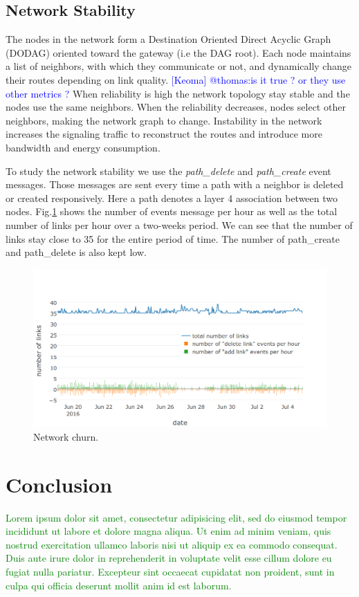 \documentclass{sig-alternate}
\newcommand{\lorem}          {\textcolor{green}{Lorem ipsum dolor sit amet, consectetur adipisicing elit, sed do eiusmod tempor incididunt ut labore et dolore magna aliqua. Ut enim ad minim veniam, quis nostrud exercitation ullamco laboris nisi ut aliquip ex ea commodo consequat. Duis aute irure dolor in reprehenderit in voluptate velit esse cillum dolore eu fugiat nulla pariatur. Excepteur sint occaecat cupidatat non proident, sunt in culpa qui officia deserunt mollit anim id est laborum.}}
\newcommand{\keoma}[1]       {\textcolor{blue}{[Keoma] #1}}
\begin{document}
\subsection{Network Stability}
\label{sec:net_stability}


The nodes in the network form a Destination Oriented Direct Acyclic Graph (DODAG) oriented toward the gateway (i.e the DAG root).
Each node maintains a list of neighbors, with which they communicate or not, and dynamically change their routes depending on link quality. \keoma{@thomas:is it true ? or they use other metrics ?}
When reliability is high the network topology stay stable and the nodes use the same neighbors.
When the reliability decreases, nodes select other neighbors, making the network graph to change.
Instability in the network increases the signaling traffic to reconstruct the routes and introduce more bandwidth and energy consumption.


To study the network stability we use the \textit{path\_delete} and \textit{path\_create} event messages.
Those messages are sent every time a path with a neighbor is deleted or created responsively.
Here a path denotes a layer 4 association between two nodes.
Fig.\ref{fig:net_churn} shows the number of events message per hour as well as the total number of links per hour over a two-weeks period.
We can see that the number of links stay close to 35 for the entire period of time.
The number of path\_create and path\_delete is also kept low.

\begin{figure}
    \centering
    \includegraphics[width=\columnwidth]{net_churn}
    \caption{Network churn.}
    \label{fig:net_churn}
\end{figure}

\section{Conclusion}
\label{sec:conclusion}


\lorem




\end{document}
